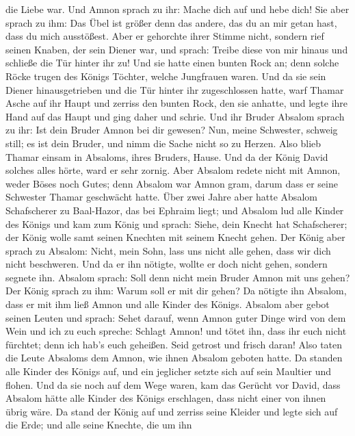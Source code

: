 die Liebe war. Und Amnon sprach zu ihr: Mache dich auf und hebe dich!
 Sie aber sprach zu ihm: Das Übel ist größer denn das
andere, das du an mir getan hast, dass du mich ausstößest. Aber er
gehorchte ihrer Stimme nicht,  sondern rief seinen Knaben,
der sein Diener war, und sprach: Treibe diese von mir hinaus und
schließe die Tür hinter ihr zu!  Und sie hatte einen bunten
Rock an; denn solche Röcke trugen des Königs Töchter, welche Jungfrauen
waren. Und da sie sein Diener hinausgetrieben und die Tür hinter ihr
zugeschlossen hatte,  warf Thamar Asche auf ihr Haupt und
zerriss den bunten Rock, den sie anhatte, und legte ihre Hand auf das
Haupt und ging daher und schrie.  Und ihr Bruder Absalom
sprach zu ihr: Ist dein Bruder Amnon bei dir gewesen? Nun, meine
Schwester, schweig still; es ist dein Bruder, und nimm die Sache nicht
so zu Herzen. Also blieb Thamar einsam in Absaloms, ihres Bruders,
Hause.  Und da der König David solches alles hörte, ward er
sehr zornig. Aber Absalom redete nicht mit Amnon, weder Böses noch
Gutes;  denn Absalom war Amnon gram, darum dass er seine
Schwester Thamar geschwächt hatte.  Über zwei Jahre aber
hatte Absalom Schafscherer zu Baal-Hazor, das bei Ephraim liegt; und
Absalom lud alle Kinder des Königs  und kam zum König und
sprach: Siehe, dein Knecht hat Schafscherer; der König wolle samt seinen
Knechten mit seinem Knecht gehen.  Der König aber sprach zu
Absalom: Nicht, mein Sohn, lass uns nicht alle gehen, dass wir dich
nicht beschweren. Und da er ihn nötigte, wollte er doch nicht gehen,
sondern segnete ihn.  Absalom sprach: Soll denn nicht mein
Bruder Amnon mit uns gehen? Der König sprach zu ihm: Warum soll er mit
dir gehen?  Da nötigte ihn Absalom, dass er mit ihm ließ
Amnon und alle Kinder des Königs.  Absalom aber gebot
seinen Leuten und sprach: Sehet darauf, wenn Amnon guter Dinge wird von
dem Wein und ich zu euch spreche: Schlagt Amnon! und tötet ihn, dass ihr
euch nicht fürchtet; denn ich hab's euch geheißen. Seid getrost und
frisch daran!  Also taten die Leute Absaloms dem Amnon, wie
ihnen Absalom geboten hatte. Da standen alle Kinder des Königs auf, und
ein jeglicher setzte sich auf sein Maultier und flohen. 
Und da sie noch auf dem Wege waren, kam das Gerücht vor David, dass
Absalom hätte alle Kinder des Königs erschlagen, dass nicht einer von
ihnen übrig wäre.  Da stand der König auf und zerriss seine
Kleider und legte sich auf die Erde; und alle seine Knechte, die um ihn
